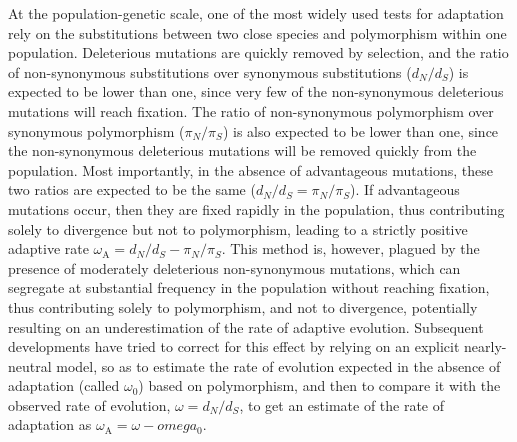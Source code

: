 \documentclass{article}
\newcommand{\dn}{d_N}
\newcommand{\ds}{d_S}
\newcommand{\dnds}{\dn / \ds}
\newcommand{\pn}{\pi_N}
\newcommand{\ps}{\pi_S}
\newcommand{\pnps}{\pn / \ps}
\begin{document}
    At the population-genetic scale, one of the most widely used tests for adaptation rely on the substitutions between two close species and polymorphism within one population\cite{mcdonald_adaptative_1991}.
    Deleterious mutations are quickly removed by selection, and the ratio of non-synonymous substitutions over synonymous substitutions ($\dnds$) is expected to be lower than one, since very few of the non-synonymous deleterious mutations will reach fixation.
    The ratio of non-synonymous polymorphism over synonymous polymorphism ($\pnps$) is also expected to be lower than one, since the non-synonymous deleterious mutations will be removed quickly from the population.
    Most importantly, in the absence of advantageous mutations, these two ratios are expected to be the same ($\dnds=\pnps$).
    If advantageous mutations occur, then they are fixed rapidly in the population, thus contributing solely to divergence but not to polymorphism, leading to a strictly positive adaptive rate $\omega_{\mathrm{A}} = \dnds-\pnps$\cite{smith_adaptive_2002}.
    This method is, however, plagued by the presence of moderately deleterious non-synonymous mutations, which can segregate at substantial frequency in the population without reaching fixation, thus contributing solely to polymorphism, and not to divergence, potentially resulting on an underestimation of the rate of adaptive evolution\cite{eyre-walker_quantifying_2002}.
    Subsequent developments have tried to correct for this effect by relying on an explicit nearly-neutral model\cite{eyre-walker_estimating_2009, galtier_adaptive_2016}, so as to estimate the rate of evolution expected in the absence of adaptation (called $\omega_0$) based on polymorphism, and then to compare it with the observed rate of evolution, $\omega=\dnds$, to get an estimate of the rate of adaptation as $\omega_{\mathrm{A}} = \omega-omega_0$.
\end{document}
